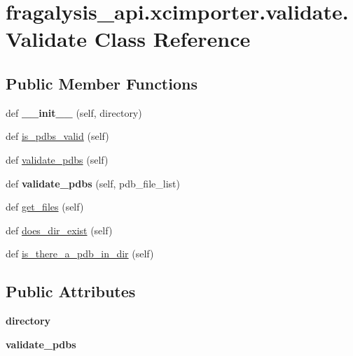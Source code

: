 \hypertarget{classfragalysis__api_1_1xcimporter_1_1validate_1_1_validate}{}\section{fragalysis\+\_\+api.\+xcimporter.\+validate.\+Validate Class Reference}
\label{classfragalysis__api_1_1xcimporter_1_1validate_1_1_validate}
\subsection*{Public Member Functions}
\begin{DoxyCompactItemize}
\item 
\mbox{\label{classfragalysis__api_1_1xcimporter_1_1validate_1_1_validate_a27319a45d204d3a917eb000a0e636e3e}} 
def {\bfseries \+\_\+\+\_\+init\+\_\+\+\_\+} (self, directory)
\item 
def \hyperlink{classfragalysis__api_1_1xcimporter_1_1validate_1_1_validate_a174b180dade39cdd984389ab32ed3732}{is\+\_\+pdbs\+\_\+valid} (self)
\item 
def \hyperlink{classfragalysis__api_1_1xcimporter_1_1validate_1_1_validate_a1e2236300274a3e4c91944ff8a10f432}{validate\+\_\+pdbs} (self)
\item 
\mbox{\label{classfragalysis__api_1_1xcimporter_1_1validate_1_1_validate_a2efb516ce319ed46c758ffbf70056df1}} 
def {\bfseries validate\+\_\+pdbs} (self, pdb\+\_\+file\+\_\+list)
\item 
def \hyperlink{classfragalysis__api_1_1xcimporter_1_1validate_1_1_validate_a0b6c43c8e26bc7b2bc5f2caf982f0a5e}{get\+\_\+files} (self)
\item 
def \hyperlink{classfragalysis__api_1_1xcimporter_1_1validate_1_1_validate_a885f473957a347300395920895108c64}{does\+\_\+dir\+\_\+exist} (self)
\item 
def \hyperlink{classfragalysis__api_1_1xcimporter_1_1validate_1_1_validate_a7203bedad575f779345a78f7880a58a2}{is\+\_\+there\+\_\+a\+\_\+pdb\+\_\+in\+\_\+dir} (self)
\end{DoxyCompactItemize}
\subsection*{Public Attributes}
\begin{DoxyCompactItemize}
\item 
\mbox{\label{classfragalysis__api_1_1xcimporter_1_1validate_1_1_validate_a4ef4b2db6e032059c04e6dead4a8998f}} 
{\bfseries directory}
\item 
\mbox{\label{classfragalysis__api_1_1xcimporter_1_1validate_1_1_validate_a73358370d6a752874ee4641f4709eb67}} 
{\bfseries validate\+\_\+pdbs}
\end{DoxyCompactItemize}


